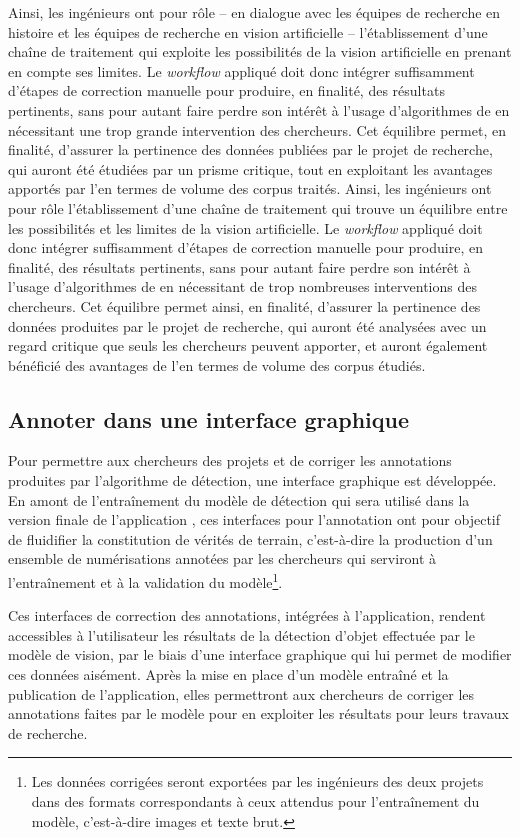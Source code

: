 	Ainsi, les ingénieurs ont pour rôle -- en dialogue avec les équipes de recherche en histoire et les équipes de recherche en vision artificielle -- l'établissement d'une chaîne de traitement qui exploite les possibilités de la vision artificielle en prenant en compte ses limites. Le \textit{workflow} appliqué doit donc intégrer suffisamment d'étapes de correction manuelle pour produire, en finalité, des résultats pertinents, sans pour autant faire perdre son intérêt à l'usage d'algorithmes de \cv en nécessitant une trop grande intervention des chercheurs. Cet équilibre permet, en finalité, d'assurer la pertinence des données publiées par le projet de recherche, qui auront été étudiées par un prisme critique, tout en exploitant les avantages apportés par l'\ia en termes de volume des corpus traités.
	Ainsi, les ingénieurs ont pour rôle l'établissement d'une chaîne de traitement qui trouve un équilibre entre les possibilités et les limites de la vision artificielle. Le \textit{workflow} appliqué doit donc intégrer suffisamment d'étapes de correction manuelle pour produire, en finalité, des résultats pertinents, sans pour autant faire perdre son intérêt à l'usage d'algorithmes de \cv en nécessitant de trop nombreuses interventions des chercheurs. Cet équilibre permet ainsi, en finalité, d'assurer la pertinence des données produites par le projet de recherche, qui auront été analysées avec un regard critique que seuls les chercheurs peuvent apporter, et auront également bénéficié des avantages de l'\ia en termes de volume des corpus étudiés. 
	
\subsection{Annoter dans une interface graphique}
    Pour permettre aux chercheurs des projets \eida et \vhs de corriger les annotations produites par l'algorithme de détection, une interface graphique est développée. En amont de l'entraînement du modèle de détection qui sera utilisé dans la version finale de l'application \eida, ces interfaces pour l'annotation ont pour objectif de fluidifier la constitution de vérités de terrain, c'est-à-dire la production d'un ensemble de numérisations annotées par les chercheurs qui serviront à l'entraînement et à la validation du modèle\footnote{Les données corrigées seront exportées par les ingénieurs des deux projets dans des formats correspondants à ceux attendus pour l'entraînement du modèle, c'est-à-dire images et texte brut.}.
     
    Ces interfaces de correction des annotations, intégrées à l'application, rendent accessibles à l'utilisateur les résultats de la détection d'objet effectuée par le modèle de vision, par le biais d'une interface graphique qui lui permet de modifier ces données aisément. Après la mise en place d'un modèle entraîné et la publication de l'application, elles permettront aux chercheurs de corriger les annotations faites par le modèle pour en exploiter les résultats pour leurs travaux de recherche.
    
